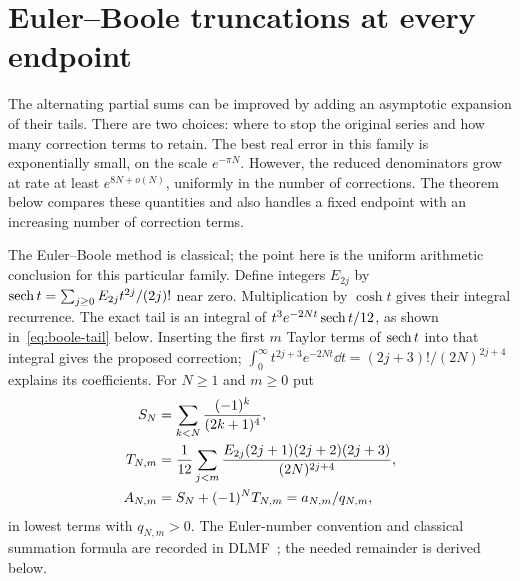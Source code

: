 \section{Euler--Boole truncations at every endpoint}\label{sec:boole}
The alternating partial sums can be improved by adding an asymptotic
expansion of their tails. There are two choices: where to stop the
original series and how many correction terms to retain. The best real
error in this family is exponentially small, on the scale
$e^{-\pi N}$. However, the reduced denominators grow at rate at least
$e^{8N+o(N)}$, uniformly in the number of corrections. The theorem below
compares these quantities and also handles a fixed endpoint with an
increasing number of correction terms.

The Euler--Boole method is classical; the point here is the uniform
arithmetic conclusion for this particular family. Define integers
$E_{2j}$ by $\operatorname{sech} t=\sum_{j\geq0}E_{2j}t^{2j}/(2j)!$ near zero.
Multiplication by $\cosh t$ gives their integral recurrence.
The exact tail is an integral of $t^3e^{-2Nt}\operatorname{sech} t/12$, as shown
in~\eqref{eq:boole-tail} below. Inserting the first $m$ Taylor terms
of $\operatorname{sech} t$ into that integral gives the proposed correction;
$\int_0^\infty t^{2j+3}e^{-2Nt}\dd t=(2j+3)!/(2N)^{2j+4}$
explains its coefficients. For $N\geq1$
and $m\geq0$ put
\begin{align}
 S_N&=\sum_{k<N}\frac{(-1)^k}{(2k+1)^4},\notag\\
 T_{N,m}&=\frac1{12}\sum_{j<m}
 \frac{E_{2j}(2j+1)(2j+2)(2j+3)}{(2N)^{2j+4}},\notag\\
 A_{N,m}&=S_N+(-1)^NT_{N,m}=a_{N,m}/q_{N,m},\label{eq:boole-def}
\end{align}
in lowest terms with $q_{N,m}>0$. The Euler-number convention and
classical summation formula are recorded in DLMF~\cite[Sections 24.2,
24.17]{DLMF}; the needed remainder is derived below.

